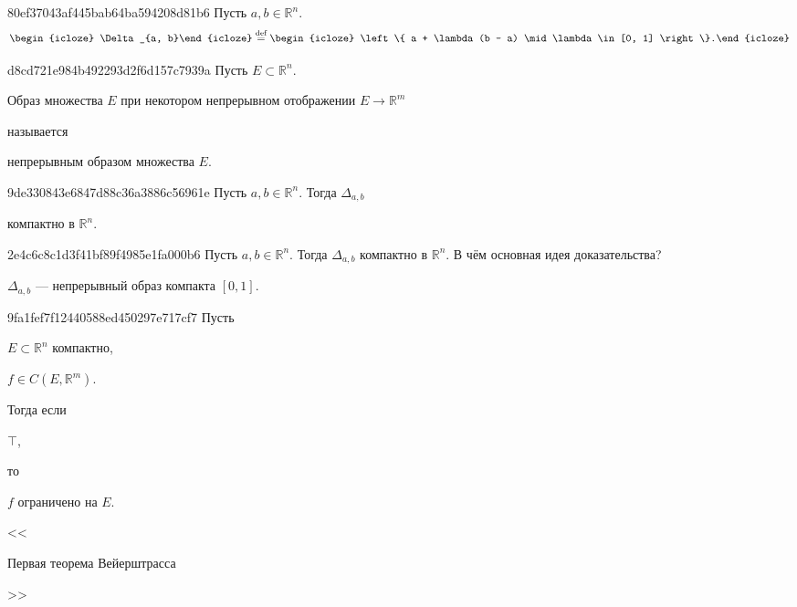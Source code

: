 \begin{note}{80ef37043af445bab64ba594208d81b6}
    Пусть \({ a, b \in \mathbb R^{n} }\).
    \[
        \begin{icloze}{2}\Delta_{a, b}\end{icloze} \overset{\text{def}}= \begin{icloze}{1}\left\{ a + \lambda(b - a) \mid \lambda \in [0, 1] \right\}.\end{icloze}
    \]
\end{note}

\begin{note}{d8cd721e984b492293d2f6d157c7939a}
    Пусть \({ E \subset \mathbb R^{n} }\). \begin{icloze}{1}Образ множества \({ E }\) при некотором непрерывном отображении \({ E \to \mathbb R^{m} }\)\end{icloze} называется \begin{icloze}{2}непрерывным образом множества \({ E }\).\end{icloze}
\end{note}

\begin{note}{9de330843e6847d88c36a3886c56961e}
    Пусть \({ a, b \in \mathbb R^{n} }\). Тогда \({ \Delta_{a, b} }\) \begin{icloze}{1}компактно в \({ \mathbb R^{n} }\).\end{icloze}
\end{note}

\begin{note}{2e4c6c8c1d3f41bf89f4985e1fa000b6}
    Пусть \({ a, b \in \mathbb R^{n} }\). Тогда \({ \Delta_{a, b} }\) компактно в \({ \mathbb R^{n} }\).
    В чём основная идея доказательства?

    \begin{cloze}{1}
        \({ \Delta_{a, b} }\) --- непрерывный образ компакта \({ [0, 1] }\).
    \end{cloze}
\end{note}

\begin{note}{9fa1fef7f12440588ed450297e717cf7}
    Пусть \begin{icloze}{3}\({ E \subset \mathbb R^{n} }\) компактно,\end{icloze}\: \begin{icloze}{4}\({ f \in C(E, \mathbb R^{m}) }\).\end{icloze}
    Тогда если \begin{icloze}{2}\({ \top }\),\end{icloze} то \begin{icloze}{1}\({ f }\) ограничено на \({ E }\).\end{icloze}

    \begin{center}
        \tiny
        <<\begin{icloze}{5}Первая теорема Вейерштрасса\end{icloze}>>
    \end{center}
\end{note}

